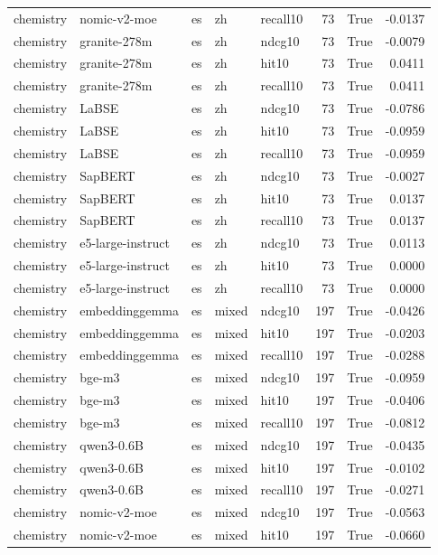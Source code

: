 \begin{tabular}{lllllrrr}
chemistry & nomic-v2-moe & es & zh & recall10 & 73 & True & -0.0137 \\
chemistry & granite-278m & es & zh & ndcg10 & 73 & True & -0.0079 \\
chemistry & granite-278m & es & zh & hit10 & 73 & True & 0.0411 \\
chemistry & granite-278m & es & zh & recall10 & 73 & True & 0.0411 \\
chemistry & LaBSE & es & zh & ndcg10 & 73 & True & -0.0786 \\
chemistry & LaBSE & es & zh & hit10 & 73 & True & -0.0959 \\
chemistry & LaBSE & es & zh & recall10 & 73 & True & -0.0959 \\
chemistry & SapBERT & es & zh & ndcg10 & 73 & True & -0.0027 \\
chemistry & SapBERT & es & zh & hit10 & 73 & True & 0.0137 \\
chemistry & SapBERT & es & zh & recall10 & 73 & True & 0.0137 \\
chemistry & e5-large-instruct & es & zh & ndcg10 & 73 & True & 0.0113 \\
chemistry & e5-large-instruct & es & zh & hit10 & 73 & True & 0.0000 \\
chemistry & e5-large-instruct & es & zh & recall10 & 73 & True & 0.0000 \\
chemistry & embeddinggemma & es & mixed & ndcg10 & 197 & True & -0.0426 \\
chemistry & embeddinggemma & es & mixed & hit10 & 197 & True & -0.0203 \\
chemistry & embeddinggemma & es & mixed & recall10 & 197 & True & -0.0288 \\
chemistry & bge-m3 & es & mixed & ndcg10 & 197 & True & -0.0959 \\
chemistry & bge-m3 & es & mixed & hit10 & 197 & True & -0.0406 \\
chemistry & bge-m3 & es & mixed & recall10 & 197 & True & -0.0812 \\
chemistry & qwen3-0.6B & es & mixed & ndcg10 & 197 & True & -0.0435 \\
chemistry & qwen3-0.6B & es & mixed & hit10 & 197 & True & -0.0102 \\
chemistry & qwen3-0.6B & es & mixed & recall10 & 197 & True & -0.0271 \\
chemistry & nomic-v2-moe & es & mixed & ndcg10 & 197 & True & -0.0563 \\
chemistry & nomic-v2-moe & es & mixed & hit10 & 197 & True & -0.0660 \\

\end{tabular}
